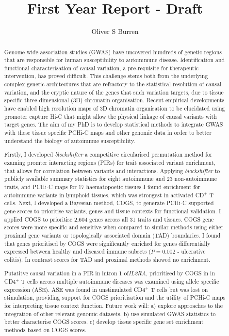 \documentclass[a4paper,11pt]{report}
\author{Oliver S Burren}
\title{First Year Report - Draft}
\begin{document}
\maketitle

\begin{abstract}
 Genome wide association studies (GWAS) have uncovered hundreds of genetic regions that are responsible for human susceptibility to autoimmune disease.  Identification and functional characterisation of causal variation, a pre-requisite for therapeutic intervention, has proved difficult. This challenge stems both from the underlying complex genetic architectures that are refractory to the statistical resolution of causal variation, and the cryptic nature of the genes that such variation targets, due to tissue specific three dimensional (3D) chromatin organisation.  Recent empirical developments have enabled high resolution maps of 3D chromatin organisation to be elucidated using promoter capture Hi-C that might allow the physical linkage of causal variants with target  genes. The aim of my PhD is to develop statistical methods to integrate GWAS with these tissue specific PCHi-C maps and other genomic data in order to better understand the biology of autoimmue susceptibility.  
 
 Firstly, I developed \textit{blockshifter} a  competitive circularised permutation method for examing promter interacting regions (PIRs) for trait associated variant enrichment, that allows for correlation between variants and interactions. Applying \textit{blockshifter} to publicly available summary statistics for eight autoimmune and 23 non-autoimmune traits, and PCHi-C maps for 17 haematopoetic tissues I found enrichment for autoimmune variants in lymphoid tissues, which was strongest in activated CD$^+$ T cells. Next, I developed a Bayesian method, COGS, to generate PCHi-C supported gene scores to prioritise variants, genes and tissue contexts for functional validation.  I applied COGS to prioritise 2,604 genes across all 31 traits and tissues. COGS gene scores were more specific and sensitive when compared to similar methods using either proximal gene variants or topologically associated domain (TAD) boundaries. I found that genes prioritised by COGS were significantly enriched for genes differentially expressed between healthy and diseased immune subsets ($P = 0.002$ - ulcerative colitis). In contrast scores for TAD and proximal methods showed no enrichment. 
 
 Putatitve causal variation in a PIR in intron 1 of\textit{IL2RA}, prioritised by COGS in  in CD4$^+$ T cells across multiple autoimmune diseases was examined using allele specific expression (ASE). ASE was found in unstimulated CD4$^{+}$ T cells but was lost on stimulation, providing support for COGS prioritisation and the utility of PCHi-C maps for interpreting tissue context function. Future work will: a) explore approaches to the integration of other relevant genomic datasets, b) use simulated GWAS statistics to better characterise COGS scores. c) develop tissue specific gene set enrichment methods based on COGS scores.  
\end{abstract}
\tableofcontents
\end{document}
